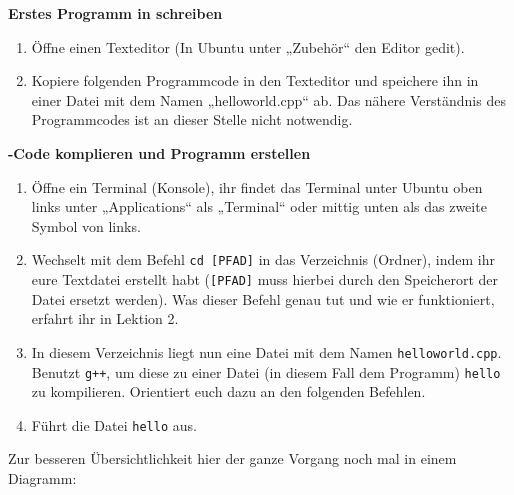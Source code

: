 \begin{praxis}

    \textbf{Erstes Programm in \Cpp schreiben}

    \begin{enumerate}
        \item Öffne einen Texteditor (In Ubuntu unter „Zubehör“ den Editor gedit).
        
        \item Kopiere folgenden Programmcode in den Texteditor und speichere ihn in einer Datei mit dem Namen „helloworld.cpp“ ab. 
        Das nähere Verständnis des Programmcodes ist an dieser Stelle nicht notwendig. 
    \end{enumerate}    


    \textbf{\Cpp-Code komplieren und Programm erstellen }
  
    \begin{enumerate}
        \item Öffne ein Terminal (Konsole), ihr findet das Terminal unter Ubuntu oben links unter „Applications“ als „Terminal“ oder mittig unten als das zweite Symbol von links.
        \item Wechselt mit dem Befehl \texttt{cd [PFAD]} in das Verzeichnis (Ordner), indem ihr eure Textdatei erstellt habt (\texttt{[PFAD]} muss hierbei durch den Speicherort der Datei ersetzt werden).
              Was dieser Befehl genau tut und wie er funktioniert, erfahrt ihr in Lektion 2.
        \item In diesem Verzeichnis liegt nun eine Datei mit dem Namen \texttt{helloworld.cpp}.
              Benutzt \texttt{g++}, um diese zu einer Datei (in diesem Fall dem Programm) \texttt{hello} zu
              kompilieren. Orientiert euch dazu an den folgenden Befehlen. 
        \item Führt die Datei \texttt{hello} aus.
    \end{enumerate}
\end{praxis}


Zur besseren Übersichtlichkeit hier der ganze Vorgang noch mal in einem
Diagramm:

\begin{center}
\end{center}

